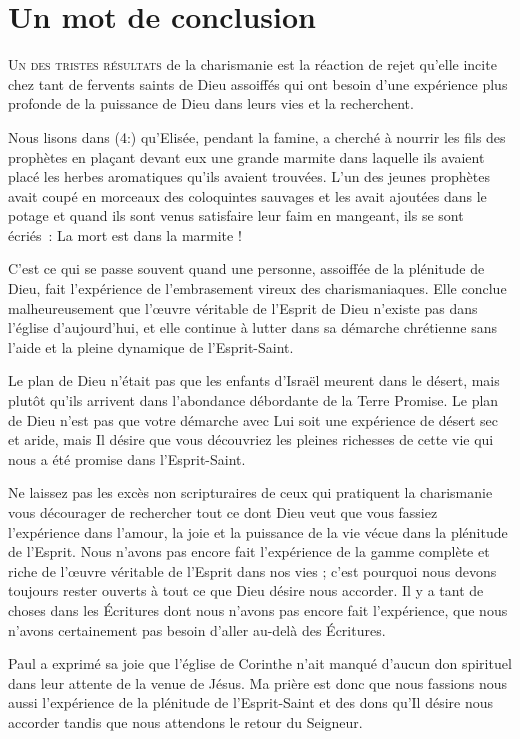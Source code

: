\chapter{Un mot de conclusion}

\lettrine{U}{n des tristes résultats} de la charismanie est la réaction de rejet
 qu'elle incite chez tant de fervents saints de Dieu assoiffés
 qui ont besoin d'une expérience plus profonde de la puissance de Dieu
 dans leurs vies et la recherchent.

Nous lisons dans (4:) qu'Elisée, pendant la famine,
 a cherché à nourrir les fils des prophètes en plaçant devant eux
 une grande marmite dans laquelle ils avaient placé les herbes
 aromatiques qu'ils avaient trouvées.
 L'un des jeunes prophètes avait coupé en morceaux des coloquintes
 sauvages et les avait ajoutées dans le potage et quand ils sont venus
 satisfaire leur faim en mangeant, ils se sont écriés~:
 \og La mort est dans la marmite ! \fg{}

C'est ce qui se passe souvent quand une personne,
 assoiffée de la plénitude de Dieu, fait l'expérience de l'embrasement
 vireux des charismaniaques. Elle conclue malheureusement
 que l'œuvre véritable de l'Esprit de Dieu n'existe pas
 dans l'église d'aujourd'hui, et elle continue à lutter
 dans sa démarche chrétienne sans l'aide et la pleine dynamique
 de l'Esprit-Saint.

Le plan de Dieu n'était pas que les enfants d'Israël meurent
 dans le désert, mais plutôt qu'ils arrivent dans l'abondance débordante
 de la Terre Promise. Le plan de Dieu n'est pas que votre démarche
 avec Lui soit une expérience de désert sec et aride, mais Il désire
 que vous découvriez les pleines richesses de cette vie
 qui nous a été promise dans l'Esprit-Saint.

Ne laissez pas les excès non scripturaires de ceux qui pratiquent 
la charismanie vous décourager de rechercher tout ce dont Dieu
 veut que vous fassiez l'expérience dans l'amour,
 la joie et la puissance de la vie vécue dans la plénitude de l'Esprit.
 Nous n'avons pas encore fait l'expérience de la gamme complète
 et riche de l'œuvre véritable de l'Esprit dans nos vies ;
 c'est pourquoi nous devons toujours rester ouverts
 à tout ce que Dieu désire nous accorder.
 Il y a tant de choses dans les Écritures dont nous n'avons pas encore
 fait l'expérience, que nous n'avons certainement pas besoin
 d'aller au-delà des Écritures.

\begin{specialpar}{}
Paul a exprimé sa joie que l'église de Corinthe n'ait manqué
 d'aucun don spirituel dans leur attente de la venue de Jésus.
 Ma prière est donc que nous fassions nous aussi l'expérience
 de la plénitude de l'Esprit-Saint et des dons qu'Il désire
 nous accorder tandis que nous attendons le retour du Seigneur.
\end{specialpar}
\closechapter


